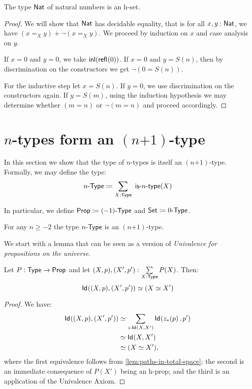 \begin{thm}\label{prop:nat-is-set}
 The type $\mathsf{Nat}$ of natural numbers is an h-set.
\end{thm}

\begin{proof}
 We will show that $\mathsf{Nat}$ has decidable equality, that is for all $x, y : \mathsf{Nat}$, we have $(x =_X y) + \neg (x =_X y)$.
 We proceed by induction on $x$ and case analysis on $y$.

 If $x = 0$ and $y = 0$, we take $\mathsf{inl}(\mathsf{refl}_{}(0))$. If $x = 0$ and $y = S(n)$,
 then by discrimination on the constructors we get $\neg (0 = S (n))$.

 For the inductive step let $x = S (n)$. If $y = 0$, we use discrimination on the constructors again.
 If $y = S (m)$, using the induction hypothesis we may determine whether $(m = n)$ or $\neg(m = n)$ and proceed accordingly.
\end{proof}

\section{$n$-types form an $(n\mbox{+}1)$-type}

In this section we show that the type of $n$-types is itself an $(n\mbox{+}1)$-type. Formally, we may define the type:
 \[n\mbox{-}\type \defeq \sum_{X : \type} \ \istype{n}(X) \]

In particular, we define $\mathsf{Prop} \coloneqq (-1)\mbox{-}\mathsf{Type}$ and $\mathsf{Set} \coloneqq 0\mbox{-}\mathsf{Type}$.

\begin{thm}\label{thm:hleveln_of_hlevelSn}
 For any $n \geq -2$ the type $n\mbox{-}\mathsf{Type}$ is an $(n\mbox{+}1)$-type.
\end{thm}

We start with a lemma that can be seen as a version of {\em Univalence for propositions on the universe}.

\begin{lem}\label{lem:sig-id-h-prop}
 Let $P : \mathsf{Type} \to \mathsf{Prop}$ and let $(X, p), (X', p') : \sum\limits_{X : \mathsf{Type}} P(X)$. Then:
 \[ \mathsf{Id}_{}((X, p),(X', p'))  \simeq (X \simeq X')\]
\end{lem}

\begin{proof}
 We have:
 \begin{equation*}\begin{split}
 \mathsf{Id}_{}((X, p),(X', p')) & \simeq \sum_{z : \mathsf{Id}_{}(X,X')} \mathsf{Id}_{}({z}_{*}\!\left({p}\right),p') \\
  & \simeq \mathsf{Id}_{}(X,X') \\
  & \simeq (X \simeq X'),
 \end{split}
 \end{equation*}
 where the first equivalence follows from \ref{lem:paths-in-total-space}; the second is an immediate consequence of $P(X')$ being an h-prop; and the third is an application of the Univalence Axiom.
\end{proof}

